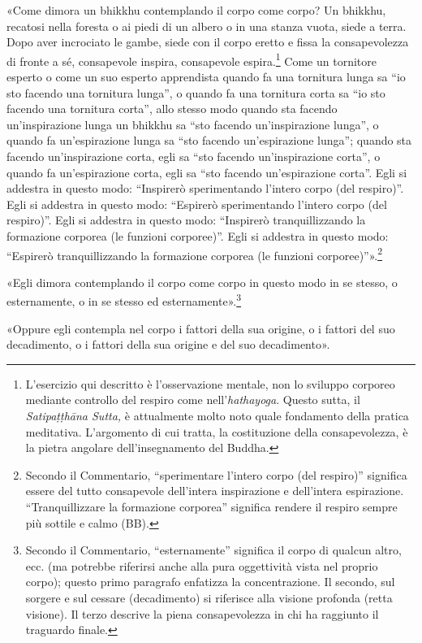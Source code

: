 

«Come dimora un bhikkhu contemplando il corpo come corpo? Un bhikkhu,
recatosi nella foresta o ai piedi di un albero o in una stanza vuota,
siede a terra. Dopo aver incrociato le gambe, siede con il corpo eretto
e fissa la consapevolezza di fronte a sé, consapevole inspira,
consapevole espira.\footnote{L’esercizio qui descritto è l’osservazione mentale, non lo sviluppo corporeo mediante controllo del respiro come nell’\emph{hathayoga}. Questo sutta, il \emph{Satipaṭṭhāna Sutta,} è attualmente molto noto quale fondamento della pratica meditativa. L’argomento di cui tratta, la costituzione della consapevolezza, è la pietra angolare dell’insegnamento del Buddha.} Come un tornitore esperto o come
un suo esperto apprendista quando fa una tornitura lunga sa “io sto
facendo una tornitura lunga”, o quando fa una tornitura corta sa “io sto
facendo una tornitura corta”, allo stesso modo quando sta facendo
un’inspirazione lunga un bhikkhu sa “sto facendo un’inspirazione lunga”,
o quando fa un’espirazione lunga sa “sto facendo un’espirazione lunga”;
quando sta facendo un’inspirazione corta, egli sa “sto facendo
un’inspirazione corta”, o quando fa un’espirazione corta, egli sa “sto
facendo un’espirazione corta”. Egli si addestra in questo modo:
“Inspirerò sperimentando l’intero corpo (del respiro)”. Egli si addestra
in questo modo: “Espirerò sperimentando l’intero corpo (del respiro)”.
Egli si addestra in questo modo: “Inspirerò tranquillizzando la
formazione corporea (le funzioni corporee)”. Egli si addestra in questo
modo: “Espirerò tranquillizzando la formazione corporea (le funzioni
corporee)”».\footnote{Secondo il Commentario, “sperimentare l’intero corpo (del respiro)” significa essere del tutto consapevole dell’intera inspirazione e dell’intera espirazione. “Tranquillizzare la formazione corporea” significa rendere il respiro sempre più sottile e calmo (BB).}


«Egli dimora contemplando il corpo come corpo in questo modo in se
stesso, o esternamente, o in se stesso ed
esternamente».\footnote{Secondo il Commentario, “esternamente” significa il corpo di qualcun altro, ecc. (ma potrebbe riferirsi anche alla pura oggettività vista nel proprio corpo); questo primo paragrafo enfatizza la concentrazione. Il secondo, sul sorgere e sul cessare (decadimento) si riferisce alla visione profonda (retta visione). Il terzo descrive la piena consapevolezza in chi ha raggiunto il traguardo finale.}


«Oppure egli contempla nel corpo i fattori della sua origine, o i
fattori del suo decadimento, o i fattori della sua origine e del suo
decadimento».


